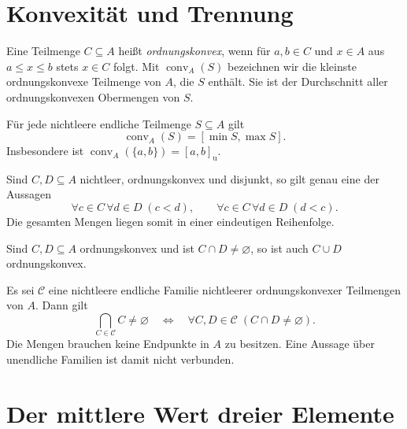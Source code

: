 \section{Konvexität und Trennung}

\begin{definition}
\label{b15guide:def:convex}
Eine Teilmenge $C\subseteq A$ heißt \emph{ordnungskonvex},
wenn für $a,b\in C$ und $x\in A$ aus $a\leq x\leq b$
stets $x\in C$ folgt.
Mit $\operatorname{conv}_A(S)$ bezeichnen wir die kleinste
ordnungskonvexe Teilmenge von $A$, die $S$ enthält.
Sie ist der Durchschnitt aller ordnungskonvexen Obermengen von $S$.
\end{definition}

\begin{theorem}
\label{b15guide:thm:finite-hull}
Für jede nichtleere endliche Teilmenge $S\subseteq A$ gilt
\[
 \operatorname{conv}_A(S)=[\min S,\max S].
\]
Insbesondere ist $\operatorname{conv}_A(\{a,b\})=[a,b]_{\mathrm u}$.
\end{theorem}

\begin{theorem}
\label{b15guide:thm:separation}
Sind $C,D\subseteq A$ nichtleer, ordnungskonvex und disjunkt,
so gilt genau eine der Aussagen
\[
 \forall c\in C\,\forall d\in D\;(c<d),\qquad
 \forall c\in C\,\forall d\in D\;(d<c).
\]
Die gesamten Mengen liegen somit in einer eindeutigen Reihenfolge.
\end{theorem}

\begin{theorem}
\label{b15guide:thm:convex-union}
Sind $C,D\subseteq A$ ordnungskonvex und ist
$C\cap D\ne\varnothing$, so ist auch $C\cup D$ ordnungskonvex.
\end{theorem}

\begin{theorem}
\label{b15guide:thm:helly}
Es sei $\mathcal C$ eine nichtleere endliche Familie
nichtleerer ordnungskonvexer Teilmengen von $A$.
Dann gilt
\[
 \bigcap_{C\in\mathcal C} C\ne\varnothing
 \quad\Longleftrightarrow\quad
 \forall C,D\in\mathcal C\;(C\cap D\ne\varnothing).
\]
Die Mengen brauchen keine Endpunkte in $A$ zu besitzen.
Eine Aussage über unendliche Familien ist damit nicht verbunden.
\end{theorem}

\section{Der mittlere Wert dreier Elemente}

